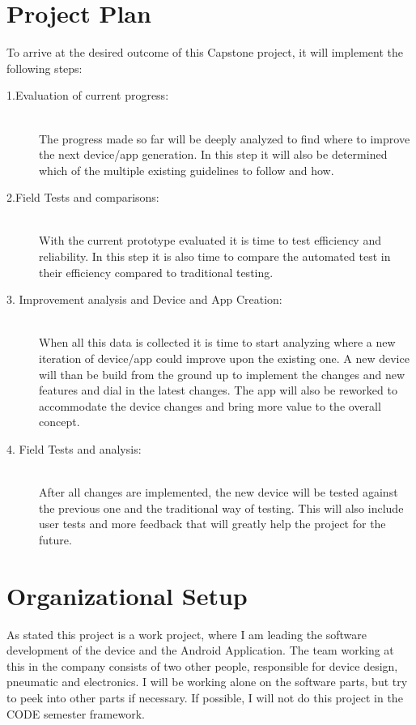 \documentclass[a4paper,12pt]{article}
\begin{document}
\newpage

\section*{Project Plan}
To arrive at the desired outcome of this Capstone project, it will implement the following steps:
\begin{description}
    \item[1.Evaluation of current progress:] \hfill \\ 
        The progress made so far will be deeply analyzed to find where to improve the next device/app generation. In this step it will also be determined which of the multiple existing guidelines to follow and how.
    \item[2.Field Tests and comparisons:] \hfill \\ 
        With the current prototype evaluated it is time to test efficiency and reliability. In this step it is also time to compare the automated test in their efficiency compared to traditional testing. 
    \item[3. Improvement analysis and Device and App Creation:] \hfill \\ 
        When all this data is collected it is time to start analyzing where a new iteration of device/app could improve upon the existing one. A new device will than be build from the ground up to implement the changes and new features and dial in the latest changes. The app will also be reworked to accommodate the device changes and bring more value to the overall concept.  
    \item[4. Field Tests and analysis:] \hfill \\ 
        After all changes are implemented, the new device will be tested against the previous one and the traditional way of testing. This will also include user tests and more feedback that will greatly help the project for the future.
\end{description}

\section*{Organizational Setup}
As stated this project is a work project, where I am leading the software development of the device and the Android Application. The team working at this in the company consists of two other people, responsible for device design, pneumatic and electronics. I will be working alone on the software parts, but try to peek into other parts if necessary. If possible, I will not do this project in the CODE semester framework.
\end{document}
